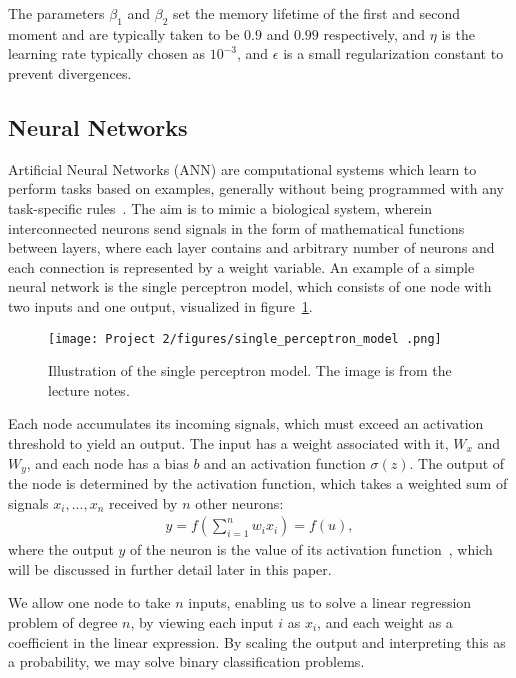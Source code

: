 \documentclass[english,notitlepage,reprint,nofootinbib]{revtex4-2}  %
\begin{document}
The parameters $\beta_1$ and $\beta_2$ set the memory lifetime of the first and second moment and are typically taken to be $0.9$ and $0.99$ respectively, and $\eta$ is the learning rate typically chosen as $10^{-3}$, and $\epsilon$ is a small regularization constant to prevent divergences. 



\subsection*{Neural Networks}%
Artificial Neural Networks (ANN) are computational systems which learn to perform tasks based on examples, generally without being programmed with any task-specific rules~\cite{friedman}. 
The aim is to mimic a biological system, wherein interconnected neurons send signals in the form of mathematical functions between layers, where each layer contains and arbitrary number of neurons and each connection is represented by a weight variable. An example of a simple neural network is the single perceptron model, which consists of one node with two inputs and one output, visualized in figure~\ref{fig: Single Perceptron Model}. 

\begin{figure}[h!]
    \centering %
    \texttt{[image: Project 2/figures/single\_perceptron\_model .png]} 
    \caption{Illustration of the single perceptron model. The image is from the lecture notes.}
    \label{fig: Single Perceptron Model}
\end{figure}

Each node accumulates its incoming signals, which must exceed an activation threshold to yield an output. The input has a weight associated with it, $W_x$ and $W_y$, and each node has a bias $b$ and an activation function $\sigma(z)$. 
The output of the node is determined by the activation function, which takes a weighted sum of signals $x_i,...,x_n$ received by $n$ other neurons: 
\begin{align}
    y = f\left(\sum\limits_{i=1}^n w_i x_i\right) = f(u), 
\end{align}
where the output $y$ of the neuron is the value of its activation function~\cite{lecture_notes}, which will be discussed in further detail later in this paper. %

We allow one node to take $n$ inputs, enabling us to solve a linear regression problem of degree $n$, by viewing each input $i$ as $x_i$, and each weight as a coefficient in the linear expression. By scaling the output and interpreting this as a probability, we may solve binary classification problems. 
\end{document}
